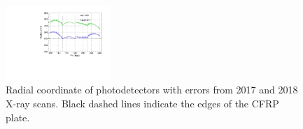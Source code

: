 \begin{figure}
\begin{center}
\includegraphics[width=4cm]{plots/2018/cRadius_1718}
\caption{ Radial coordinate of photodetectors with errors from 2017 and 2018
X-ray scans.  Black dashed lines indicate the edges of the CFRP plate.}
\label{fig:radiuscalculation} 
\end{center}
\end{figure}


